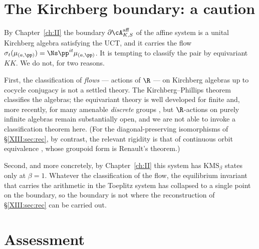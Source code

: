 \section{The Kirchberg boundary: a caution}

\begin{remark}\label{XIII:rem:kirchberg}
By Chapter~\ref{ch:II} the boundary $\partial\cA^{\mathrm{aff}}_{K,S}$ of the affine
system is a unital Kirchberg algebra satisfying the UCT, and it carries the flow
$\sigma_t(\mu_{(a,\pp)})=\Ns\pp^{it}\mu_{(a,\pp)}$. It is tempting to classify the pair by
equivariant $KK$. We do not, for two reasons.

First, the classification of \emph{flows} --- actions of $\R$ --- on Kirchberg algebras up to
cocycle conjugacy is not a settled theory. The Kirchberg--Phillips theorem
\cite{KirchbergPhillips} classifies the algebras; the equivariant theory is well developed
for finite and, more recently, for many amenable \emph{discrete} groups \cite{Szabo}, but
$\R$-actions on purely infinite algebras remain substantially open, and we are not able to
invoke a classification theorem here. (For the diagonal-preserving isomorphisms of
\S\ref{XIII:sec:rec}, by contrast, the relevant rigidity is that of continuous orbit
equivalence \cite{Li,Matsumoto}, whose groupoid form is Renault's theorem.)

Second, and more concretely, by Chapter~\ref{ch:II} this system has
$\mathrm{KMS}_\beta$ states only at $\beta=1$. Whatever the classification of the flow, the
equilibrium invariant that carries the arithmetic in the Toeplitz system has collapsed to a
single point on the boundary, so the boundary is not where the reconstruction of
\S\ref{XIII:sec:rec} can be carried out.
\end{remark}

\section{Assessment}

